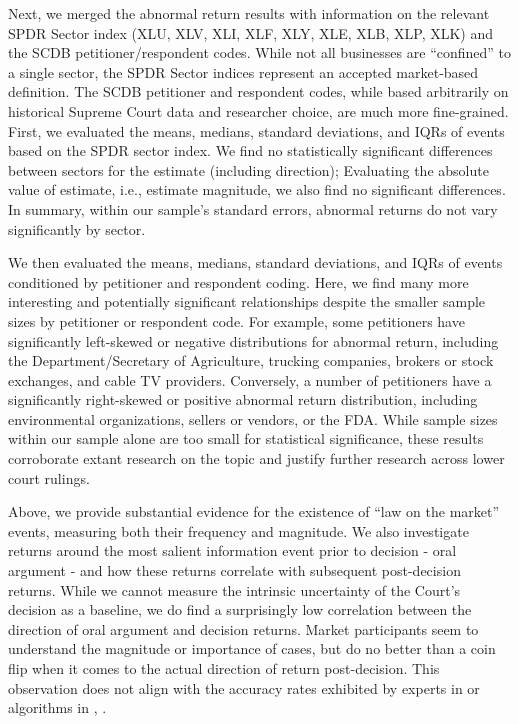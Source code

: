 \documentclass[preprint,12pt]{elsarticle}
\begin{document}
Next, we merged the abnormal return results with information on the relevant SPDR Sector index (XLU, XLV, XLI, XLF, XLY, XLE, XLB, XLP, XLK) and the SCDB petitioner/respondent codes.  While not all businesses are ``confined'' to a single sector, the SPDR Sector indices represent an accepted market-based definition.  The SCDB petitioner and respondent codes, while based arbitrarily on historical Supreme Court data and researcher choice, are much more fine-grained.   First, we evaluated the means, medians, standard deviations, and IQRs of events based on the SPDR sector index.  We find no statistically significant differences between sectors for the estimate (including direction); Evaluating the absolute value of estimate, i.e., estimate magnitude, we also find no significant differences.  In summary, within our sample's standard errors, abnormal returns do not vary significantly by sector.

We then evaluated the means, medians, standard deviations, and IQRs of events conditioned by petitioner and respondent coding.  Here, we find many more interesting and potentially significant relationships despite the smaller sample sizes by petitioner or respondent code.  For example, some petitioners have significantly left-skewed or negative distributions for abnormal return, including the Department/Secretary of Agriculture, trucking companies, brokers or stock exchanges, and cable TV providers.  Conversely, a number of petitioners have a significantly right-skewed or positive abnormal return distribution, including environmental organizations, sellers or vendors, or the FDA.  While sample sizes within our sample alone are too small for statistical significance, these results corroborate extant research on the topic and justify further research across lower court rulings.

Above, we provide substantial evidence for the existence of ``law on the market'' events, measuring both their frequency and magnitude.  We also investigate returns around the most salient information event prior to decision - oral argument - and how these returns correlate with subsequent post-decision returns.  While we cannot measure the intrinsic uncertainty of the Court's decision as a baseline, we do find a surprisingly low correlation between the direction of oral argument and decision returns.  Market participants seem to understand the magnitude or importance of cases, but do no better than a coin flip when it comes to the actual direction of return post-decision.  This observation does not align with the accuracy rates exhibited by experts in \cite{ruger2004supreme} or algorithms in \cite{katz2017general}, \cite{ruger2004supreme}.
\end{document}
